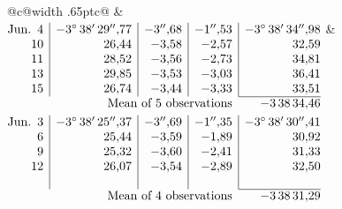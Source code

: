 \noindent\begin{tabular}{@{}c@{\hspace{.4em}\vrule width .65pt\hspace{.4em}}c@{}}
 &
 \\[.18ex]
\(\begin{array}[t]{@{}r|r|r|r|r@{}}
\text{Jun.}\enspace 4 & -3^\circ\,38'\,29''{,}77 & -3''{,}68 & -1''{,}53 & -3^\circ\,38'\,34''{,}98\\
10 & 26{,}44 & -3{,}58 & -2{,}57 & 32{,}59\\
11 & 28{,}52 & -3{,}56 & -2{,}73 & 34{,}81\\
13 & 29{,}85 & -3{,}53 & -3{,}03 & 36{,}41\\
15 & 26{,}74 & -3{,}44 & -3{,}33 & 33{,}51\\
\cline{5-5}
\multicolumn{4}{r}{\text{Mean of 5 observations}} & -3\,38\,34{,}46
\end{array}\)
&
\(\begin{array}[t]{@{}r|r|r|r|r@{}}
\text{Jun.}\enspace 3 & -3^\circ\,38'\,25''{,}37 & -3''{,}69 & -1''{,}35 & -3^\circ\,38'\,30''{,}41\\
6 & 25{,}44 & -3{,}59 & -1{,}89 & 30{,}92\\
9 & 25{,}32 & -3{,}60 & -2{,}41 & 31{,}33\\
12 & 26{,}07 & -3{,}54 & -2{,}89 & 32{,}50\\
 & & & & \\
\cline{5-5}
\multicolumn{4}{r}{\text{Mean of 4 observations}} & -3\,38\,31{,}29
\end{array}\)
\end{tabular}\par\medskip
\bigskip
{}
